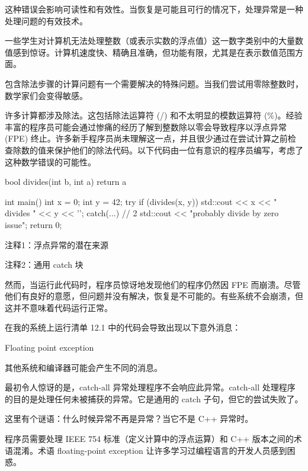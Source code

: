 这种错误会影响可读性和有效性。当恢复是可能且可行的情况下，处理异常是一种处理问题的有效技术。

一些学生对计算机无法处理整数（或表示实数的浮点值）这一数字类别中的大量数值感到惊讶。计算机速度快、精确且准确，但功能有限，尤其是在表示数值范围方面。

包含除法步骤的计算问题有一个需要解决的特殊问题。当我们尝试用零除整数时，数学家们会变得敏感。


许多计算都涉及除法。这包括除法运算符 (/) 和不太明显的模数运算符 (\%)。经验丰富的程序员可能会通过惨痛的经历了解到整数除以零会导致程序以浮点异常 (FPE) 终止。许多新手程序员尚未理解这一点，并且很少通过在尝试计算之前检查除数的值来保护他们的除法代码。以下代码由一位有意识的程序员编写，考虑了这种数学错误的可能性。


\begin{cpp}
bool divides(int b, int a) {
  return a %
}

int main() {
  int x = 0;
  int y = 42;
  try {
  if (divides(x, y))
    std::cout << x << " divides " << y << '\n';
  } catch(...) { // 2
    std::cout << "probably divide by zero issue\n";
  }
  return 0;
}
\end{cpp}

{\footnotesize
注释1：浮点异常的潜在来源

注释2：通用 catch 块
}

然而，当运行此代码时，程序员惊讶地发现他们的程序仍然因 FPE 而崩溃。尽管他们有良好的意愿，但问题并没有解决，恢复是不可能的。有些系统不会崩溃，但这并不意味着代码运行正常。


在我的系统上运行清单 12.1 中的代码会导致出现以下意外消息：

\begin{shell}
Floating point exception
\end{shell}

其他系统和编译器可能会产生不同的消息。

最初令人惊讶的是，catch-all 异常处理程序不会响应此异常。catch-all 处理程序的目的是处理任何未被捕获的异常。它是通用的 catch 子句，但它的尝试失败了。


这里有个谜语：什么时候异常不再是异常？当它不是 C++ 异常时。

程序员需要处理 IEEE 754 标准（定义计算中的浮点运算）和 C++ 版本之间的术语混淆。术语 floating-point exception 让许多学习过编程语言的开发人员感到困惑。


